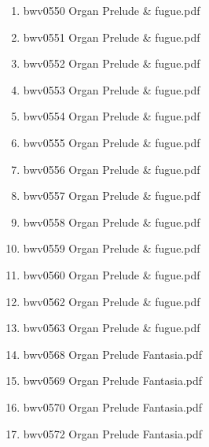 \documentclass[11pt]{article}
\begin{document}
\begin{enumerate}
\begin{enumerate}
\begin{enumerate}
\begin{enumerate}
\item bwv0550   Organ Prelude \& fugue.pdf
\label{sec-1-1-1-1-44-6-4-1-3-20}

\item bwv0551   Organ Prelude \& fugue.pdf
\label{sec-1-1-1-1-44-6-4-1-3-21}

\item bwv0552   Organ Prelude \& fugue.pdf
\label{sec-1-1-1-1-44-6-4-1-3-22}

\item bwv0553   Organ Prelude \& fugue.pdf
\label{sec-1-1-1-1-44-6-4-1-3-23}

\item bwv0554   Organ Prelude \& fugue.pdf
\label{sec-1-1-1-1-44-6-4-1-3-24}

\item bwv0555   Organ Prelude \& fugue.pdf
\label{sec-1-1-1-1-44-6-4-1-3-25}

\item bwv0556   Organ Prelude \& fugue.pdf
\label{sec-1-1-1-1-44-6-4-1-3-26}

\item bwv0557   Organ Prelude \& fugue.pdf
\label{sec-1-1-1-1-44-6-4-1-3-27}

\item bwv0558   Organ Prelude \& fugue.pdf
\label{sec-1-1-1-1-44-6-4-1-3-28}

\item bwv0559   Organ Prelude \& fugue.pdf
\label{sec-1-1-1-1-44-6-4-1-3-29}

\item bwv0560   Organ Prelude \& fugue.pdf
\label{sec-1-1-1-1-44-6-4-1-3-30}

\item bwv0562   Organ Prelude \& fugue.pdf
\label{sec-1-1-1-1-44-6-4-1-3-31}

\item bwv0563   Organ Prelude \& fugue.pdf
\label{sec-1-1-1-1-44-6-4-1-3-32}

\item bwv0568   Organ Prelude Fantasia.pdf
\label{sec-1-1-1-1-44-6-4-1-3-33}

\item bwv0569   Organ Prelude Fantasia.pdf
\label{sec-1-1-1-1-44-6-4-1-3-34}

\item bwv0570   Organ Prelude Fantasia.pdf
\label{sec-1-1-1-1-44-6-4-1-3-35}

\item bwv0572   Organ Prelude Fantasia.pdf
\label{sec-1-1-1-1-44-6-4-1-3-36}


\end{enumerate}
\end{enumerate}
\end{enumerate}
\end{enumerate}
\end{document}
